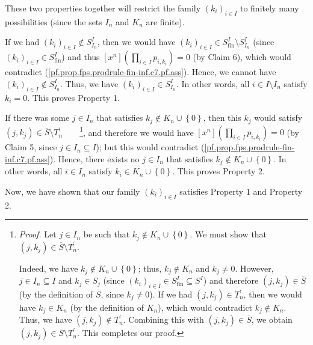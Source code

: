 \noindent These two properties together will restrict the family $\left(
k_{i}\right)  _{i\in I}$ to finitely many possibilities (since the sets
$I_{n}$ and $K_{n}$ are finite).

If we had $\left(  k_{i}\right)  _{i\in I}\notin S_{I_{n}}^{I}$, then we would
have $\left(  k_{i}\right)  _{i\in I}\in S_{\operatorname*{fin}}^{I}\setminus
S_{I_{n}}^{I}$ (since $\left(  k_{i}\right)  _{i\in I}\in
S_{\operatorname*{fin}}^{I}$) and thus $\left[  x^{n}\right]  \left(
\prod_{i\in I}p_{i,k_{i}}\right)  =0$ (by Claim 6), which would contradict
(\ref{pf.prop.fps.prodrule-fin-inf.c7.pf.ass}). Hence, we cannot have $\left(
k_{i}\right)  _{i\in I}\notin S_{I_{n}}^{I}$. Thus, we have $\left(
k_{i}\right)  _{i\in I}\in S_{I_{n}}^{I}$. In other words, all $i\in
I\setminus I_{n}$ satisfy $k_{i}=0$. This proves Property 1.

If there was some $j\in I_{n}$ that satisfies $k_{j}\notin K_{n}\cup\left\{
0\right\}  $, then this $k_{j}$ would satisfy $\left(  j,k_{j}\right)
\in\overline{S}\setminus T_{n}^{\prime}$\ \ \ \ \footnote{\textit{Proof.} Let
$j\in I_{n}$ be such that $k_{j}\notin K_{n}\cup\left\{  0\right\}  $. We must
show that $\left(  j,k_{j}\right)  \in\overline{S}\setminus T_{n}^{\prime}$.
\par
Indeed, we have $k_{j}\notin K_{n}\cup\left\{  0\right\}  $; thus,
$k_{j}\notin K_{n}$ and $k_{j}\neq0$. However, $j\in I_{n}\subseteq I$ and
$k_{j}\in S_{j}$ (since $\left(  k_{i}\right)  _{i\in I}\in
S_{\operatorname*{fin}}^{I}\subseteq S^{I}$) and therefore $\left(
j,k_{j}\right)  \in\overline{S}$ (by the definition of $\overline{S}$, since
$k_{j}\neq0$). If we had $\left(  j,k_{j}\right)  \in T_{n}^{\prime}$, then we
would have $k_{j}\in K_{n}$ (by the definition of $K_{n}$), which would
contradict $k_{j}\notin K_{n}$. Thus, we have $\left(  j,k_{j}\right)  \notin
T_{n}^{\prime}$. Combining this with $\left(  j,k_{j}\right)  \in\overline{S}%
$, we obtain $\left(  j,k_{j}\right)  \in\overline{S}\setminus T_{n}^{\prime}%
$. This completes our proof.}, and therefore we would have $\left[
x^{n}\right]  \left(  \prod_{i\in I}p_{i,k_{i}}\right)  =0$ (by Claim 5, since
$j\in I_{n}\subseteq I$); but this would contradict
(\ref{pf.prop.fps.prodrule-fin-inf.c7.pf.ass}). Hence, there exists no $j\in
I_{n}$ that satisfies $k_{j}\notin K_{n}\cup\left\{  0\right\}  $. In other
words, all $i\in I_{n}$ satisfy $k_{i}\in K_{n}\cup\left\{  0\right\}  $. This
proves Property 2.

Now, we have shown that our family $\left(  k_{i}\right)  _{i\in I}$ satisfies
Property 1 and Property 2.

